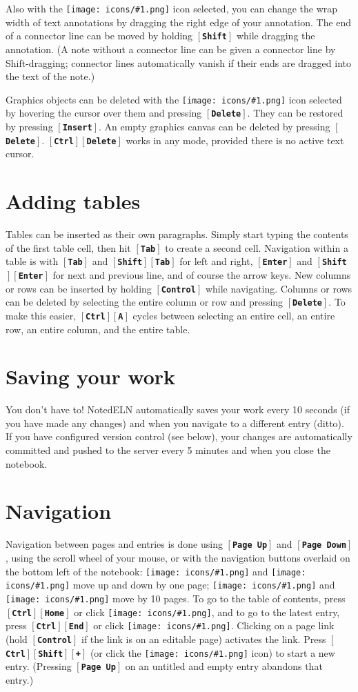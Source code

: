 \documentclass[11pt]{report}
\def\keystroke#1{$\left[\right.\!${\tt\bfseries #1}$\!\left.\right]$}
\def\key#1{\keystroke{#1}}
\def\keycombo#1#2{\keystroke{#1}\keystroke{#2}}
\def\keycontrol#1{\keycombo{Ctrl}{#1}}
\def\keyshift#1{\keycombo{Shift}{#1}}
\def\controlshift#1{\keystroke{Ctrl}\keystroke{Shift}\keystroke{#1}}
\def\icon#1{\raise-2pt\hbox{\texttt{[image: icons/\#1.png]}}}
\begin{document}
Also with the \icon{move} icon selected, you can change
the wrap width of text annotations by dragging the right edge of your
annotation. The end of a connector line can be moved by holding
\key{Shift} while dragging the annotation. (A note without a connector
line can be given a connector line by Shift-dragging; connector lines
automatically vanish if their ends are dragged into the text of the
note.)

Graphics objects can be deleted with the \icon{move} icon selected by
hovering the cursor over them and pressing \key{Delete}. They can be
restored by pressing \key{Insert}. An empty graphics canvas can be
deleted by pressing \key{Delete}. \keycontrol{Delete} works in any
mode, provided there is no active text cursor.

\section{Adding tables}

Tables can be inserted as their own paragraphs. Simply start typing
the contents of the first table cell, then hit \key{Tab} to create a
second cell. Navigation within a table is with \key{Tab} and
\keyshift{Tab} for left and right, \key{Enter} and \keyshift{Enter}
for next and previous line, and of course the arrow keys. New columns
or rows can be inserted by holding \key{Control} while
navigating. Columns or rows can be deleted by selecting the entire
column or row and pressing \key{Delete}. To make this easier,
\keycontrol{A} cycles between selecting an entire cell, an entire row,
an entire column, and the entire table.

\section{Saving your work}

You don't have to! NotedELN automatically saves your work every 10 seconds
(if you have made any changes) and when you navigate to a different
entry (ditto). If you have configured version control (see below),
your changes are automatically committed and pushed to the server
every 5 minutes and when you close the notebook.

\section{Navigation}

Navigation between pages and entries is done using \key{Page Up} and
\key{Page Down}, using the scroll wheel of your mouse, or with the
navigation buttons overlaid on the bottom left of the notebook:
\icon{nav-prev} and \icon{nav-next} move up and down by one page;
\icon{nav-p10} and \icon{nav-n10} move by 10 pages. To go
to the table of contents, press \keycontrol{Home} or click
\icon{nav-toc}, and to go to the latest entry, press \keycontrol{End}
or click \icon{nav-end}. Clicking on a page link (hold \key{Control}
if the link is on an editable page) activates the link. Press
\controlshift{+} (or click the \icon{nav-plus} icon) to start a new
entry. (Pressing
\key{Page Up} on an untitled and empty  entry  abandons that 
entry.)
\end{document}
